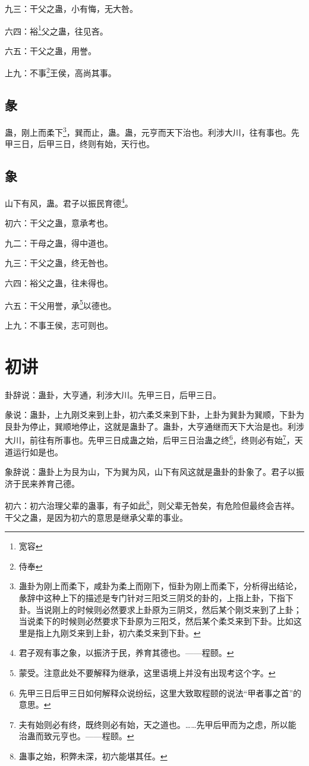 \documentclass[12pt,oneside]{book}
\begin{document}
九三：干父之蛊，小有悔，无大咎。

六四：裕\footnote{宽容}父之蛊，往见吝。

六五：干父之蛊，用誉。

上九：不事\footnote{侍奉}王侯，高尚其事。

\subsection{彖}
蛊，刚上而柔下\footnote{蛊卦为刚上而柔下，咸卦为柔上而刚下，恒卦为刚上而柔下，分析得出结论，彖辞中这种上下的描述是专门针对三阳爻三阴爻的卦的，上指上卦，下指下卦。当说刚上的时候则必然要求上卦原为三阴爻，然后某个刚爻来到了上卦；当说柔下的时候则必然要求下卦原为三阳爻，然后某个柔爻来到下卦。比如这里是指上九刚爻来到上卦，初六柔爻来到下卦。}，巽而止，蛊。蛊，元亨而天下治也。利涉大川，往有事也。先甲三日，后甲三日，终则有始，天行也。

\subsection{象}
山下有风，蛊。君子以振民育德\footnote{君子观有事之象，以振济于民，养育其德也。——程颐。}。

初六：干父之蛊，意承考也。

九二：干母之蛊，得中道也。

九三：干父之蛊，终无咎也。

六四：裕父之蛊，往未得也。

六五：干父用誉，承\footnote{蒙受。注意此处不要解释为继承，这里语境上并没有出现考这个字。}以德也。

上九：不事王侯，志可则也。

\section{初讲}
卦辞说：蛊卦，大亨通，利涉大川。先甲三日，后甲三日。

彖说：蛊卦，上九刚爻来到上卦，初六柔爻来到下卦，上卦为巽卦为巽顺，下卦为艮卦为停止，巽顺地停止，这就是蛊卦了。蛊卦，大亨通继而天下大治是也。利涉大川，前往有所事也。先甲三日成蛊之始，后甲三日治蛊之终\footnote{先甲三日后甲三日如何解释众说纷纭，这里大致取程颐的说法“甲者事之首”的意思。}，终则必有始\footnote{夫有始则必有终，既终则必有始，天之道也。……先甲后甲而为之虑，所以能治蛊而致元亨也。——程颐。}，天道运行如是也。

象辞说：蛊卦上为艮为山，下为巽为风，山下有风这就是蛊卦的卦象了。君子以振济于民来养育己德。

初六：初六治理父辈的蛊事，有子如此\footnote{蛊事之始，积弊未深，初六能堪其任。}，则父辈无咎矣，有危险但最终会吉祥。干父之蛊，是因为初六的意思是继承父辈的事业。
\end{document}
